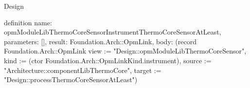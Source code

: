 \begin{lexlean}{Design}
\begin{semanticmodule}
definition{
  name: opmModuleLibThermoCoreSensorInstrumentThermoCoreSensorAtLeast,
  parameters: [],
  result: Foundation.Arch::OpmLink,
  body: (record Foundation.Arch::OpmLink {view := "Design::opmModuleLibThermoCoreSensor", kind := (ctor Foundation.Arch::OpmLinkKind.instrument), source := "Architecture::componentLibThermoCore", target := "Design::processThermoCoreSensorAtLeast"})
}
\end{semanticmodule}
\end{lexlean}
